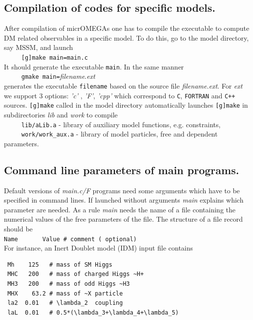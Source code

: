 \documentclass[12pt,a4paper]{article}
\begin{document}
\subsection{Compilation of codes for specific models.}
 After compilation of micrOMEGAs one has to compile
the executable to compute DM related observables in a specific model. To
do this, go to the model directory, say MSSM,  and launch\\
\verb|     [g]make main=main.c|\\
It should generate the executable {\tt main}. In the same manner\\
\verb|     gmake main=|{\it filename}.{\it ext}\\ 
generates the executable {\tt filename}  based on the source file {\it
filename.ext}.
For {\it ext}  we support 3 options: {\it 'c'} , {\it 'F'}, {\it 'cpp'} which correspond to
{\tt C}, {\tt FORTRAN} and {\tt C++} sources.
{\tt [g]make} called  in the model directory automatically  launches {\tt [g]make}
in subdirectories {\it lib} and {\it work} to compile \\
 \verb|     lib/aLib.a|   - library of auxiliary model functions, e.g. constraints,\\
 \verb|     work/work_aux.a| - library of model particles, free and dependent parameters.\\

\subsection{ Command line parameters of main programs.}
\label{sec:command}
Default versions of {\it main.c/F}  programs need some arguments
which have to be specified in command lines. If launched without
arguments {\it main} explains which parameter are needed. 
As a rule  {\it main}  needs  the name of a file containing the
numerical values of the free parameters of the file. The structure of a file
record should be\\
\verb|Name       Value # comment ( optional)|\\
For instance, an Inert Doublet model (IDM) input file contains
\begin{verbatim}
 Mh    125   # mass of SM Higgs 
 MHC   200   # mass of charged Higgs ~H+
 MH3   200   # mass of odd Higgs ~H3
 MHX    63.2 # mass of ~X particle
 la2  0.01   # \lambda_2  coupling
 laL  0.01   # 0.5*(\lambda_3+\lambda_4+\lambda_5)
\end{verbatim}
\end{document}
